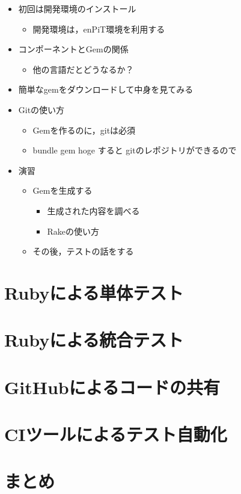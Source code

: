 \documentclass[t, aspectratio=169]{beamer}
\begin{document}
\begin{itemize}
\item 初回は開発環境のインストール
\begin{itemize}
\item 開発環境は，enPiT環境を利用する
\end{itemize}
\item コンポーネントとGemの関係
\begin{itemize}
\item 他の言語だとどうなるか？
\end{itemize}
\item 簡単なgemをダウンロードして中身を見てみる
\item Gitの使い方
\begin{itemize}
\item Gemを作るのに，gitは必須
\item bundle gem hoge すると gitのレポジトリができるので
\end{itemize}
\item 演習
\begin{itemize}
\item Gemを生成する
\begin{itemize}
\item 生成された内容を調べる
\item Rakeの使い方
\end{itemize}
\item その後，テストの話をする
\end{itemize}
\end{itemize}

\part{Rubyによる単体テスト}
\label{sec-3}

\part{Rubyによる統合テスト}
\label{sec-4}

\part{GitHubによるコードの共有}
\label{sec-5}

\part{CIツールによるテスト自動化}
\label{sec-6}

\part{まとめ}
\label{sec-7}
\end{document}
